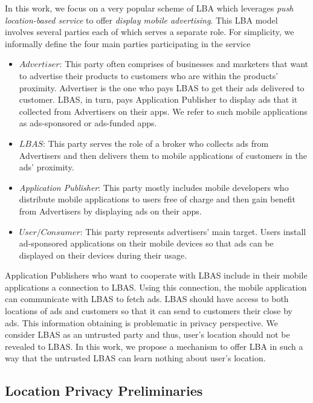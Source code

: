 In this work, we focus on a very popular scheme of LBA which leverages \textit{push location-based service} to offer \textit{display mobile advertising}. This LBA model involves several parties each of which serves a separate role. For simplicity, we informally define the four main parties participating in the service
\begin{itemize}
\item $Advertiser$: This party often comprises of businesses and marketers that want to advertise their products to customers who are within the products' proximity. Advertiser is the one who pays LBAS to get their ads delivered to customer. LBAS, in turn, pays Application Publisher to display ads that it collected from Advertisers on their apps. We refer to such mobile applications as ads-sponsored or ads-funded apps.
\item $LBAS$: This party serves the role of a broker who collects ads from Advertisers and then delivers them to mobile applications of customers in the ads' proximity.
\item \textit{Application Publisher}: This party mostly includes mobile developers who distribute mobile applications to users free of charge and then gain benefit from Advertisers by displaying ads on their apps.
\item $User / Consumer$: This party represents advertisers' main target. Users install ad-sponsored applications on their mobile devices so that ads can be displayed on their devices during their usage.
\end{itemize}

Application Publishers who want to cooperate with LBAS include in their mobile applications a connection to LBAS. Using this connection, the mobile application can communicate with LBAS to fetch ads. 
LBAS should have access to both locations of ads and customers so that it can send to customers their close by ads. This information obtaining is problematic in privacy perspective. We consider LBAS as an untrusted party and thus, user's location should not be revealed to LBAS. In this work, we propose a mechanism to offer LBA in such a way that the untrusted LBAS can learn nothing about user's location.



\subsection{Location Privacy Preliminaries}

